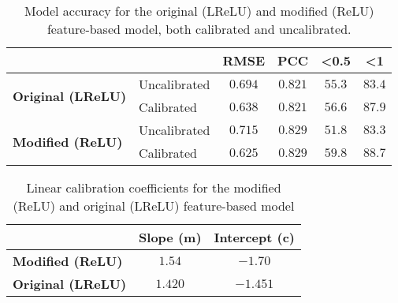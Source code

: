 \begin{table}[H]
    \centering
    \begin{tabular}{|l|l|c|c|c|c|}
        \hline
        \multicolumn{2}{|l|}{\textbf{}} & \textbf{RMSE} & \textbf{PCC} & \textbf{\textless 0.5} & \textbf{\textless 1}          \\ \hline
        \multirow{2}{*}{\textbf{Original (LReLU)}}
                                        & Uncalibrated  & $0.694$      & $0.821$                & $55.3$               & $83.4$ \\ \cline{2-6}
                                        & Calibrated    & $0.638$      & $0.821$                & $56.6$               & $87.9$ \\ \hline
        \multirow{2}{*}{\textbf{Modified (ReLU)}}
                                        & Uncalibrated  & $0.715$      & $0.829$                & $51.8$               & $83.3$ \\ \cline{2-6}
                                        & Calibrated    & $0.625$      & $0.829$                & $59.8$               & $88.7$ \\ \hline
    \end{tabular}
    \caption{Model accuracy for the original (LReLU) and modified (ReLU) feature-based model, both calibrated and uncalibrated.}
    \label{tab:model_accuracy_relu}
\end{table}


\begin{table}[H]
    \centering
    \begin{tabular}{|l|c|c|}
        \hline
        \textbf{}                 & \textbf{Slope (m)} & \textbf{Intercept (c)} \\ \hline
        \textbf{Modified (ReLU)}  & $1.54$             & $-1.70$                \\ \hline
        \textbf{Original (LReLU)} & $1.420$            & $-1.451$               \\ \hline
    \end{tabular}
    \caption{Linear calibration coefficients for the modified (ReLU) and original (LReLU) feature-based model}
    \label{tab:linear_regression_coefficients_relu}
\end{table}

